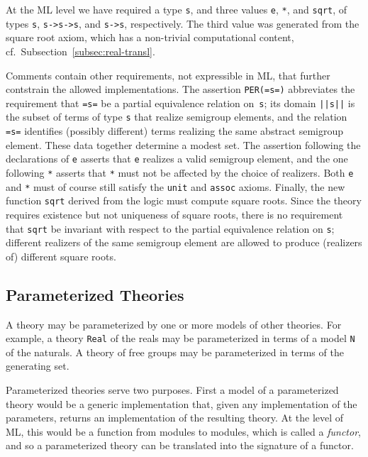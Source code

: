 At the ML level we have required a type \Verb|s|, and three values
\Verb|e|, \Verb|*|, and \Verb|sqrt|, of types \Verb|s|,
\Verb|s->s->s|, and \Verb|s->s|, respectively. The third value was
generated from the square root axiom, which has a non-trivial
computational content, cf.\ Subsection~\ref{subsec:real-transl}.

Comments contain other requirements, not expressible in ML, that
further contstrain the allowed implementations. The assertion
\Verb|PER(=s=)| abbreviates the requirement that \Verb|=s=| be a
partial equivalence relation on~\Verb|s|; its domain \Verb+||s||+ is
the subset of terms of type \Verb|s| that realize semigroup
elements, and the relation \Verb|=s=| identifies (possibly different)
terms realizing the same abstract semigroup element. These data
together determine a modest set. The assertion following the
declarations of \Verb|e| asserts that \Verb|e| realizes a valid
semigroup element, and the one following \Verb|*| asserts that
\Verb|*| must not be affected by the choice of realizers. Both
\Verb|e| and \Verb|*| must of course still satisfy the \Verb|unit| and
\Verb|assoc| axioms. Finally, the new function \Verb|sqrt| derived
from the logic must compute square roots. Since the theory requires
existence but not uniqueness of square roots, there is no requirement
that \Verb|sqrt| be invariant with respect to the partial equivalence
relation on \Verb|s|; different realizers of the same semigroup
element are allowed to produce (realizers of) different square roots.


\subsection{Parameterized Theories}
\label{sec:param-theor-funct}

A theory may be parameterized by one or more models of other theories.
For example, a theory \Verb|Real| of the reals may be parameterized in
terms of a model \Verb|N| of the naturals.  A theory of free groups may be
parameterized in terms of the generating set.

Parameterized theories serve two purposes.  First a model of a
parameterized theory would be a generic implementation that, given any
implementation of the parameters, returns an implementation of the
resulting theory.  At the level of ML, this would be a function from
modules to modules, which is called a \emph{functor}, and so a
parameterized theory can be translated into the signature of a
functor.

